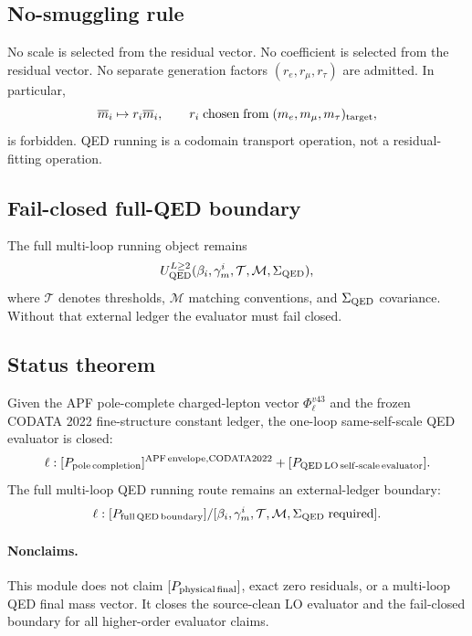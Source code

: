 \subsection{No-smuggling rule}
No scale is selected from the residual vector. No coefficient is selected from the residual vector. No separate generation factors
\((r_e,r_\mu,r_\tau)\) are admitted. In particular,
\[
\overline m_i\mapsto r_i\overline m_i,
\qquad
r_i\;{\rm chosen\;from}\;(m_e,m_\mu,m_\tau)_{\rm target},
\]
is forbidden. QED running is a codomain transport operation, not a residual-fitting operation.

\subsection{Fail-closed full-QED boundary}
The full multi-loop running object remains
\[
U_{\rm QED}^{L\ge 2}(
\beta_i,\gamma_m^i,\mathcal T,\mathcal M,\Sigma_{\rm QED}),
\]
where \(\mathcal T\) denotes thresholds, \(\mathcal M\) matching conventions, and \(\Sigma_{\rm QED}\) covariance. Without that external ledger the evaluator must fail closed.

\subsection{Status theorem}
\begin{theorem}
Given the APF pole-complete charged-lepton vector \(\Phi_\ell^{v43}\) and the frozen CODATA 2022 fine-structure constant ledger, the one-loop same-self-scale QED evaluator is closed:
\[
\ell:
[P_{\rm pole\,completion}]^{\rm APF\,envelope,CODATA2022}
+
[P_{\rm QED\,LO\,self\text{-}scale\,evaluator}].
\]
The full multi-loop QED running route remains an external-ledger boundary:
\[
\ell:
[P_{\rm full\,QED\,boundary}]/
[\beta_i,\gamma_m^i,\mathcal T,\mathcal M,\Sigma_{\rm QED}\;{\rm required}].
\]
\end{theorem}

\paragraph{Nonclaims.}
This module does not claim \([P_{\rm physical\,final}]\), exact zero residuals, or a multi-loop QED final mass vector. It closes the source-clean LO evaluator and the fail-closed boundary for all higher-order evaluator claims.
